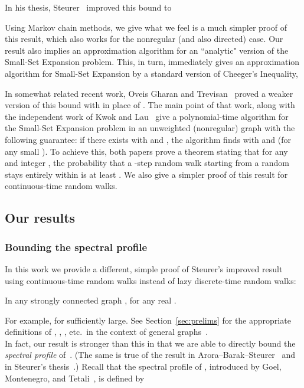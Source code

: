 \documentclass[11pt]{article}
\begin{document}
In his thesis, Steurer~\cite{Ste10a} improved this bound to

Using Markov chain methods, we give what we feel is a much simpler proof of this result, which also works for the nonregular (and also directed) case.  Our result also implies an approximation algorithm for an ``analytic" version of the Small-Set Expansion problem.  This, in turn, immediately gives an approximation algorithm for Small-Set Expansion by a standard version of Cheeger's Inequality,

In somewhat related recent work, Oveis Gharan and Trevisan~\cite{OT12} proved a weaker version of this bound with  in place of .  The main point of that work, along with the independent work of Kwok and Lau~\cite{KL12} give a polynomial-time algorithm for the Small-Set Expansion problem in an unweighted (nonregular) graph  with the following guarantee:  if there exists  with  and , the algorithm finds  with  and  (for any small ).  To achieve this, both papers prove a theorem stating that for any  and integer , the probability that a -step random walk starting from a random  stays entirely within  is at least  .  We also give a simpler proof of this result for continuous-time random walks.


\subsection{Our results}

\subsubsection{Bounding the spectral profile}
In this work we provide a different, simple proof of Steurer's improved result using continuous-time random walks instead of lazy discrete-time random walks:
\begin{theorem} \label{thm:our-conductance-profile}
    In any strongly connected graph ,  for any real .
\end{theorem}
\noindent For example,  for  sufficiently large.  See Section~\ref{sec:prelims} for the appropriate definitions of , , , etc.\ in the context of general graphs~.\\

In fact, our result is stronger than this in that we are able to directly bound the \emph{spectral profile} of~.  (The same is true of the result in Arora--Barak--Steurer~\cite{ABS10} and in Steurer's thesis~\cite{Ste10a}.)  Recall that the spectral profile  of , introduced by Goel, Montenegro, and Tetali~\cite{GMT06}, is defined by
\end{document}
